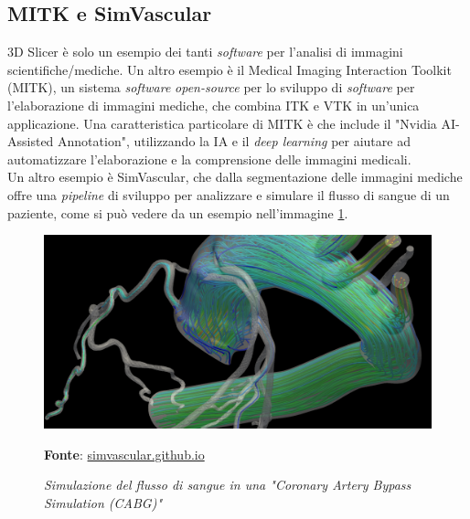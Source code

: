 \subsection{MITK e SimVascular}
3D Slicer è solo un esempio dei tanti \emph{software} per l'analisi di immagini scientifiche/mediche. Un altro esempio è il Medical Imaging Interaction Toolkit (MITK), un sistema \emph{software} \emph{open-source} per lo sviluppo di \emph{software} per l'elaborazione di immagini mediche, che combina ITK e VTK in un'unica applicazione. Una caratteristica particolare di MITK è che include il "Nvidia AI-Assisted Annotation", utilizzando la IA e il \emph{deep learning} per aiutare ad automatizzare l'elaborazione e la comprensione delle immagini medicali.
\\
Un altro esempio è SimVascular, che dalla segmentazione delle immagini mediche offre una \emph{pipeline} di sviluppo per analizzare e simulare il flusso di sangue di un paziente, come si può vedere da un esempio nell'immagine \ref{fig: SimVascular}.

\begin{figure}[h]
    \centering
    \includegraphics[scale=0.2]{immagini/volumerendering/simvascular.png}
    \caption{\textit{Simulazione del flusso di sangue in una "Coronary Artery Bypass Simulation (CABG)"}}
    \textbf{Fonte}: \href{http://simvascular.github.io/}{simvascular.github.io}
    \label{fig: SimVascular}
\end{figure}


